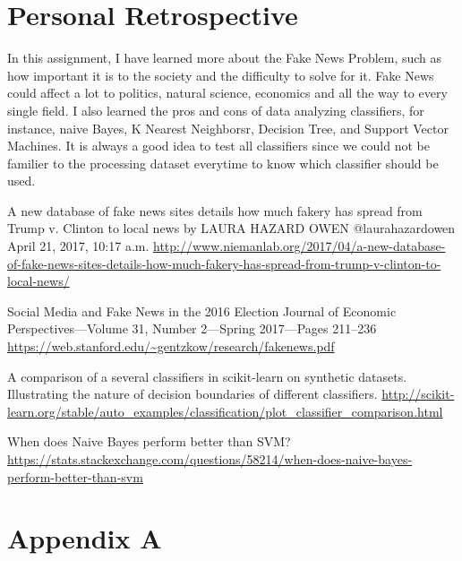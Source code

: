 \documentclass[twoside,twocolumn]{article}
\begin{document}
    \section{Personal Retrospective}
    In this assignment, I have learned more about the Fake News Problem, such as how important it
    is to the society and the difficulty to solve for it. Fake News could affect a lot to politics,
    natural science, economics and all the way to every single field. I also learned the pros and 
    cons of data analyzing classifiers, for instance, naive Bayes, K Nearest Neighborsr, Decision Tree,
    and Support Vector Machines. It is always a good idea to test all classifiers since we could not 
    be familier to the processing dataset everytime to know which classifier should be used. 

    \begin{thebibliography}{99} %

    A new database of fake news sites details how much fakery has spread from Trump v. 
    Clinton to local news by LAURA HAZARD OWEN @laurahazardowen April 21, 2017, 10:17 a.m. \url{http://www.niemanlab.org/2017/04/a-new-database-of-fake-news-sites-details-how-much-fakery-has-spread-from-trump-v-clinton-to-local-news/}

    
    Social Media and Fake News in the 2016 Election Journal of Economic Perspectives—Volume 31, 
    Number 2—Spring 2017—Pages 211–236 \url{https://web.stanford.edu/~gentzkow/research/fakenews.pdf}

    A comparison of a several classifiers in scikit-learn on synthetic datasets. Illustrating the nature 
    of decision boundaries of different classifiers. \url{http://scikit-learn.org/stable/auto_examples/classification/plot_classifier_comparison.html}
    
    When does Naive Bayes perform better than SVM? \url{https://stats.stackexchange.com/questions/58214/when-does-naive-bayes-perform-better-than-svm}
    \end{thebibliography}


    \newpage
    \appendix
    \section{Appendix A}
    
\end{document}
